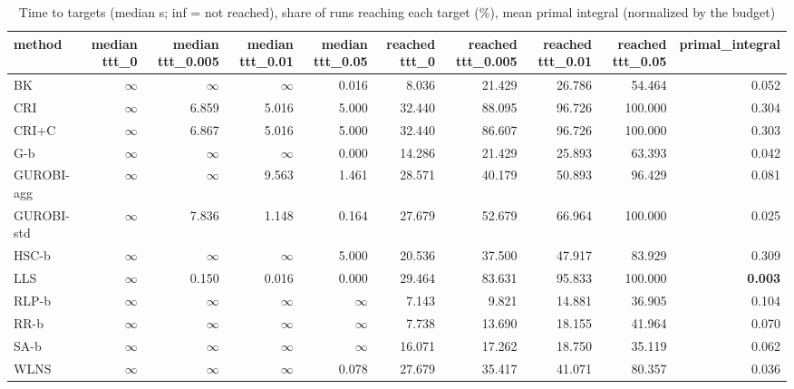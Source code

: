 \begin{table}[htbp]
\centering
\small
\caption{Time to targets (median s; inf = not reached), share of runs reaching each target (\%), mean primal integral (normalized by the budget)}
\label{tab:E4a_equal_budgets_b10_ttt}
\begin{tabular}{lrrrrrrrrr}
\toprule
method & median ttt\_0 & median ttt\_0.005 & median ttt\_0.01 & median ttt\_0.05 & reached ttt\_0 & reached ttt\_0.005 & reached ttt\_0.01 & reached ttt\_0.05 & primal\_integral \\
\midrule
BK & $\infty$ & $\infty$ & $\infty$ & 0.016 & 8.036 & 21.429 & 26.786 & 54.464 & 0.052 \\
CRI & $\infty$ & 6.859 & 5.016 & 5.000 & 32.440 & 88.095 & 96.726 & 100.000 & 0.304 \\
CRI+C & $\infty$ & 6.867 & 5.016 & 5.000 & 32.440 & 86.607 & 96.726 & 100.000 & 0.303 \\
G-b & $\infty$ & $\infty$ & $\infty$ & 0.000 & 14.286 & 21.429 & 25.893 & 63.393 & 0.042 \\
GUROBI-agg & $\infty$ & $\infty$ & 9.563 & 1.461 & 28.571 & 40.179 & 50.893 & 96.429 & 0.081 \\
GUROBI-std & $\infty$ & 7.836 & 1.148 & 0.164 & 27.679 & 52.679 & 66.964 & 100.000 & 0.025 \\
HSC-b & $\infty$ & $\infty$ & $\infty$ & 5.000 & 20.536 & 37.500 & 47.917 & 83.929 & 0.309 \\
LLS & $\infty$ & 0.150 & 0.016 & 0.000 & 29.464 & 83.631 & 95.833 & 100.000 & \textbf{0.003} \\
RLP-b & $\infty$ & $\infty$ & $\infty$ & $\infty$ & 7.143 & 9.821 & 14.881 & 36.905 & 0.104 \\
RR-b & $\infty$ & $\infty$ & $\infty$ & $\infty$ & 7.738 & 13.690 & 18.155 & 41.964 & 0.070 \\
SA-b & $\infty$ & $\infty$ & $\infty$ & $\infty$ & 16.071 & 17.262 & 18.750 & 35.119 & 0.062 \\
WLNS & $\infty$ & $\infty$ & $\infty$ & 0.078 & 27.679 & 35.417 & 41.071 & 80.357 & 0.036 \\
\bottomrule
\end{tabular}
\end{table}
